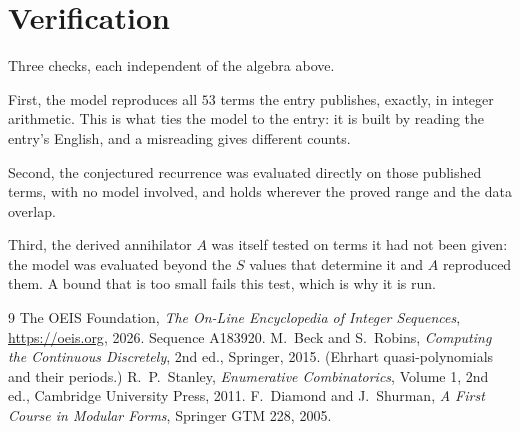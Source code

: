 \documentclass[11pt,a4paper]{article}
\theoremstyle{plain}
\theoremstyle{definition}
\begin{document}
\section{Verification}

Three checks, each independent of the algebra above.

First, the model reproduces all $53$ terms the entry publishes, exactly, in integer
arithmetic. This is what ties the model to the entry: it is built by reading the entry's
English, and a misreading gives different counts.

Second, the conjectured recurrence was evaluated directly on those published terms, with no
model involved, and holds wherever the proved range and the data overlap.

Third, the derived annihilator $A$ was itself tested on terms it had not been given: the model
was evaluated beyond the $S$ values that determine it and $A$ reproduced them. A bound that is
too small fails this test, which is why it is run.

\begin{thebibliography}{9}
 The OEIS Foundation, \emph{The On-Line Encyclopedia of Integer
Sequences}, \url{https://oeis.org}, 2026. Sequence A183920.
 M.~Beck and S.~Robins, \emph{Computing the Continuous Discretely},
2nd ed., Springer, 2015. (Ehrhart quasi-polynomials and their periods.)
 R.~P.~Stanley, \emph{Enumerative Combinatorics}, Volume 1, 2nd ed.,
Cambridge University Press, 2011.
 F.~Diamond and J.~Shurman, \emph{A First Course in Modular Forms},
Springer GTM 228, 2005.
\end{thebibliography}
\end{document}
